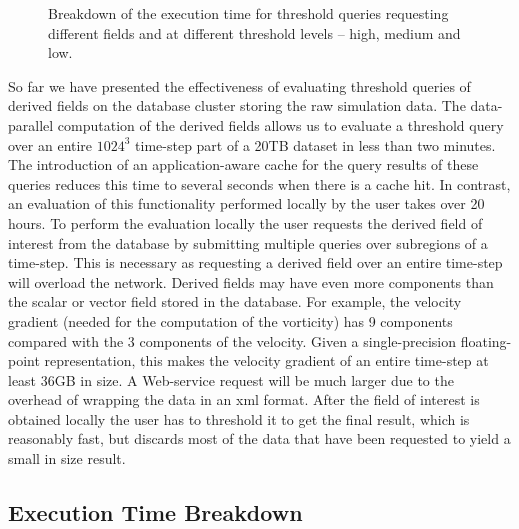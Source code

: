 \documentclass{sig-alternate}
\newcommand{\kk}[1]{{\color{blue}{\it KK: #1}}}
\begin{document}
\begin{figure}
\caption{Breakdown of the execution time for threshold queries requesting different fields and at different threshold levels -- high, medium and low.}
\label{fig:breakdown}
\end{figure}

So far we have presented the effectiveness of evaluating threshold queries of derived fields on the database cluster storing the raw simulation data. The 
data-parallel computation of the derived fields allows us to evaluate a threshold query over
an entire $1024^3$ time-step part of a 20TB dataset in less than two minutes. The introduction of an application-aware cache for the query results of these
queries reduces this time to several seconds when there is a cache hit. In contrast, an evaluation of this functionality performed locally by the user takes
over 20 hours. To perform the evaluation locally the user requests the derived field of interest from the database by submitting multiple queries over
subregions of a time-step. This is necessary as requesting a derived field over an entire time-step will overload the network. Derived fields may have even
more components than the scalar or vector field stored in the database. For example, the velocity gradient (needed for the computation of the vorticity) has 9
components compared with the 3 components of the velocity. Given a single-precision floating-point representation, this makes the velocity gradient of an
entire time-step at least 36GB in size. A Web-service request will be much larger due to the overhead of wrapping the data in an xml format. After the
field of interest is obtained locally the user has to threshold it to get the final result, which is reasonably fast, but discards most of the data that have been
requested to yield a small in size result. 

\subsection{Execution Time Breakdown}
\kk{OR}
\end{document}
